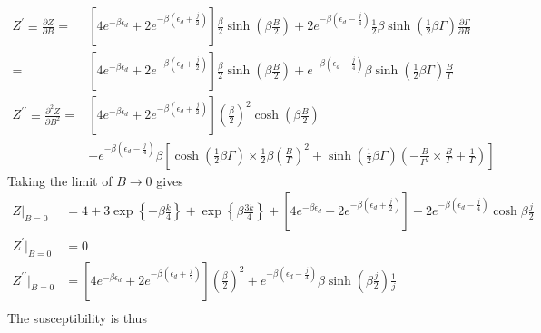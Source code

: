 \documentclass[12pt,twoside]{article}
\numberwithin{equation}{section}
\begin{document}
\begin{equation}\begin{aligned}
	Z^\prime \equiv \frac{\partial{Z}}{\partial{B}} =& \left[4e^{-\beta \epsilon_d} + 2e^{-\beta \left(\epsilon_d + \frac{j}{2}\right)}\right] \frac{\beta}{2}\sinh \left(\beta \frac{B}{2}\right) + 2e^{-\beta\left(\epsilon_d - \frac{j}{4}\right)}\frac{1}{2}\beta \sinh \left(\frac{1}{2}\beta \Gamma\right) \frac{\partial{\Gamma}}{\partial{B}} \\
	=& \left[4e^{-\beta \epsilon_d} + 2e^{-\beta \left(\epsilon_d + \frac{j}{2}\right)}\right] \frac{\beta}{2}\sinh \left(\beta \frac{B}{2}\right) + e^{-\beta\left(\epsilon_d - \frac{j}{4}\right)}\beta \sinh \left(\frac{1}{2}\beta \Gamma \right) \frac{B}{\Gamma}\\
	Z^{\prime\prime} \equiv \frac{\partial^2{Z}}{\partial{B^2}} =& \left[4e^{-\beta \epsilon_d} + 2e^{-\beta \left(\epsilon_d + \frac{j}{2}\right)}\right] \left(\frac{\beta}{2}\right)^2 \cosh \left(\beta \frac{B}{2}\right) \\
								     &+ e^{-\beta\left(\epsilon_d - \frac{j}{4}\right)}\beta \left[\cosh \left(\frac{1}{2}\beta \Gamma \right) \times \frac{1}{2}\beta \left(\frac{B}{\Gamma}\right)^2 + \sinh \left(\frac{1}{2}\beta \Gamma \right) \left(-\frac{B}{\Gamma^2}\times \frac{B}{\Gamma} + \frac{1}{\Gamma} \right)\right]
\end{aligned}\end{equation}
Taking the limit of \(B \to 0\) gives
\begin{equation}\begin{aligned}
	Z\vert_{B=0} &= 4 + 3\exp\left\{-\beta \frac{k}{4}\right\} + \exp\left\{\beta \frac{3k}{4}\right\} + \left[4e^{-\beta \epsilon_d} + 2e^{-\beta \left(\epsilon_d + \frac{j}{2}\right)}\right] + 2e^{-\beta\left(\epsilon_d - \frac{j}{4}\right)}\cosh \beta \frac{j}{2}\\
	Z^\prime\vert_{B=0} &= 0\\
	Z^{\prime\prime}\vert_{B=0} &= \left[4e^{-\beta \epsilon_d} + 2e^{-\beta \left(\epsilon_d + \frac{j}{2}\right)}\right] \left(\frac{\beta}{2}\right)^2 + e^{-\beta\left(\epsilon_d - \frac{j}{4}\right)}\beta \sinh \left(\beta \frac{j}{2} \right) \frac{1}{j}\\
\end{aligned}\end{equation}
The susceptibility is thus
\end{document}
